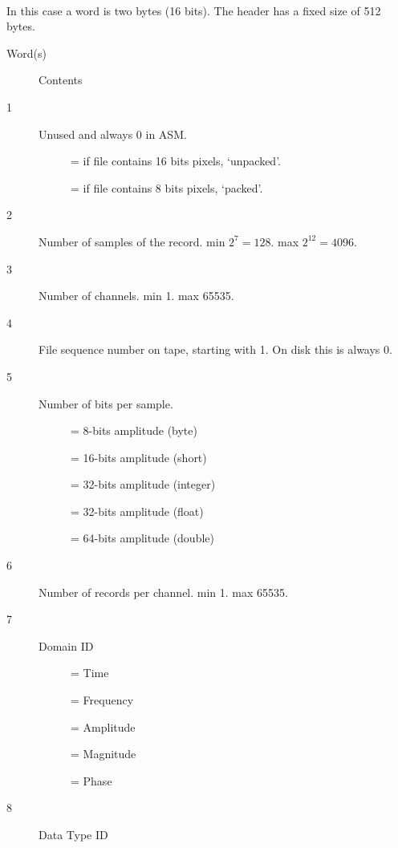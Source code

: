 \documentclass{report}
\begin{document}
\paragraph{}
In this case a word is two bytes (16 bits). The header has a
fixed size of 512 bytes.

\begin{description}
\item[Word(s)] Contents
\item[1] Unused and always 0 in ASM.
         \begin{description}
             \item[] = if file contains 16 bits pixels, `unpacked'.
             \item[] = if file contains 8 bits pixels, `packed'.
	     \end{description}
\item[2] Number of samples of the record. min $2^{7}=128$. max $2^{12}=4096$.
\item[3] Number of channels. min 1. max 65535.
\item[4] File sequence number on tape, starting with 1. On disk this is
             always 0.
\item[5] Number of bits per sample.
         \begin{description}
             \item[]    = 8-bits amplitude (byte)
			 \item[]   = 16-bits amplitude (short)
			 \item[]   = 32-bits amplitude (integer)
			 \item[] = 32-bits amplitude (float)
			 \item[] = 64-bits amplitude (double)
	     \end{description}
\item[6] Number of records per channel. min 1. max 65535.
\item[7] Domain ID
         \begin{description}
             \item[]   = Time
			 \item[]   = Frequency
			 \item[]   = Amplitude
			 \item[]   = Magnitude
			 \item[]   = Phase
	     \end{description}
\item[8] Data Type ID
         \begin{description}

\end{description}
\end{description}
\end{document}
